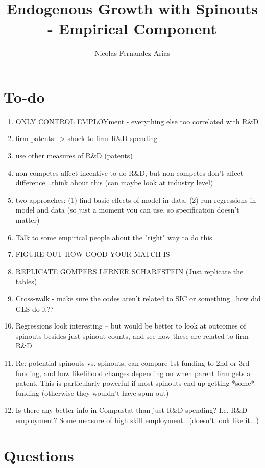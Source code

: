 \documentclass[12pt,english]{article}
\theoremstyle{remark}
\begin{document}
	
	
	
\title{Endogenous Growth with Spinouts - Empirical Component}
\author{Nicolas Fernandez-Arias}
\maketitle

\section*{To-do}

\begin{enumerate}
	\item ONLY CONTROL EMPLOYment - everything else too correlated with R\&D 
	\item firm patents --> shock to firm R\&D spending 
	\item use other measures of R\&D (patents)
	\item non-competes affect incentive to do R\&D, but non-competes don't affect difference ..think about this (can maybe look at industry level)
	\item two approaches: (1) find basic effects of model in data, (2) run regressions in model and data (so just a moment you can use, so specification doesn't matter)
	\item Talk to some empirical people about the "right" way to do this
	\item FIGURE OUT HOW GOOD YOUR MATCH IS
	\item REPLICATE GOMPERS LERNER SCHARFSTEIN (Just replicate the tables)
	\item Cross-walk - make sure the codes aren't related to SIC or something...how did GLS do it??
	\item Regressions look interesting -- but would be better to look at outcomes of spinouts besides just spinout counts, and see how these are related to firm R\&D
	\item Re: potential spinouts vs. spinouts, can compare 1st funding to 2nd or 3rd funding, and how likelihood changes depending on when parent firm gets a patent. This is particularly powerful if most spinouts end up getting *some* funding (otherwise they wouldn't have spun out)
	\item Is there any better info in Compustat than just R\&D spending? I.e. R\&D employment? Some measure of high skill employment...(doesn't look like it...)
\end{enumerate}

\section*{Questions}
\end{document}
